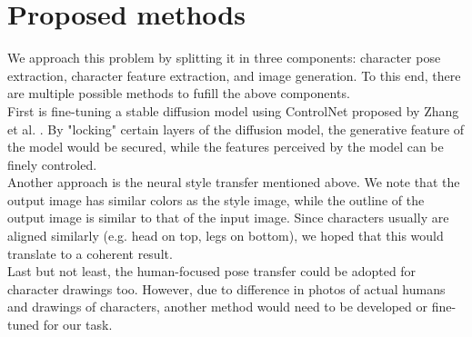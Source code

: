 \documentclass{article}
\begin{document}
\section{Proposed methods}
We approach this problem by splitting it in three components: character pose extraction, character feature extraction, and image generation. To this end, there are multiple possible methods to fufill the above components.\\
First is fine-tuning a stable diffusion model using ControlNet proposed by Zhang et al. \cite{zhang2023adding}. By "locking" certain layers of the diffusion model, the generative feature of the model would be secured, while the features perceived by the model can be finely controled.\\
Another approach is the neural style transfer \cite{gatys2015neural} mentioned above. We note that the output image has similar colors as the style image, while the outline of the output image is similar to that of the input image. Since characters usually are aligned similarly (e.g. head on top, legs on bottom), we hoped that this would translate to a coherent result.\\
Last but not least, the human-focused pose transfer could be adopted for character drawings too. However, due to difference in photos of actual humans and drawings of characters, another method would need to be developed or fine-tuned for our task.
\end{document}
